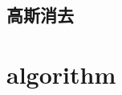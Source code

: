     \subsection{高斯消去}
        
\clearpage

%         
%         
    
%         

        
\section{algorithm}
